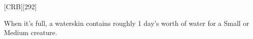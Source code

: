 
[CRB][292]

When it's full, a waterskin contains roughly 1 day's worth of water for a Small or Medium creature.

\vfill

